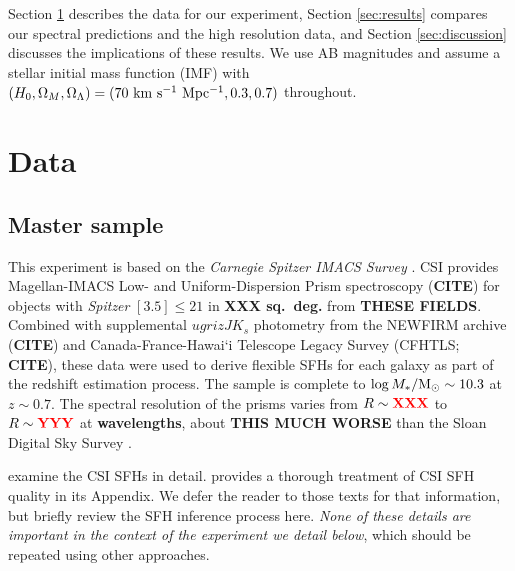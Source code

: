 \documentclass[a4paper,fleqn,usenatbib]{mnras}
\newcommand{\Msun}{{\rm M}_\odot}
\newcommand{\Mstel}{M_\ast}
\newcommand{\logM}{\log\Mstel/\Msun}
\newcommand{\bfr}{\bf\color{red}}
\newcommand{\CITE}{{\bfr CITE}}
\begin{document}
Section \ref{sec:data} describes the data for our experiment, Section \ref{sec:results} compares 
our spectral predictions and the high resolution data, and Section \ref{sec:discussion} discusses 
the implications of these results. We use AB magnitudes and assume 
a \citet{Chabrier03} stellar initial mass function (IMF) with $(H_{0}, \Omega_{M}, \Omega_{\Lambda}) =
(70~{\rm km~s^{-1}~Mpc^{-1}}, 0.3, 0.7)$ throughout.



\section{Data}
\label{sec:data}

\subsection{Master sample}
\label{sec:master}

This experiment is based on the {\it Carnegie Spitzer IMACS Survey} \citep[CSI;][]{Kelson14a}. CSI provides
Magellan-IMACS Low- and Uniform-Dispersion Prism spectroscopy (\CITE) for objects with {\it Spitzer} 
$[3.5]\leq21$ in {\bfr XXX sq.~deg.} from {\bfr THESE FIELDS}. Combined with supplemental 
$ugrizJK_{s}$ photometry from the NEWFIRM archive (\CITE) and Canada-France-Hawai`i Telescope 
Legacy Survey (CFHTLS; \CITE), these data were used to derive flexible SFHs for each galaxy as part of 
the redshift estimation process. The sample is complete to $\logM\sim10.3$ at $z\sim0.7$.
The spectral resolution of the prisms varies from $R\sim{\bfr XXX}$ to $R\sim{\bfr YYY}$ at
{\bfr wavelengths}, about {\bfr THIS MUCH WORSE} than the Sloan Digital Sky Survey \citep{York00}.

\citet{Dressler16, Dressler18} examine the CSI SFHs in detail. \citet{Dressler18} provides a thorough treatment 
of CSI SFH quality in its Appendix. We defer the reader to those texts for that information, but briefly review 
the SFH inference process here. {\it None of these details are important in the context of the experiment we 
detail below}, which should be repeated using other approaches.
\end{document}
